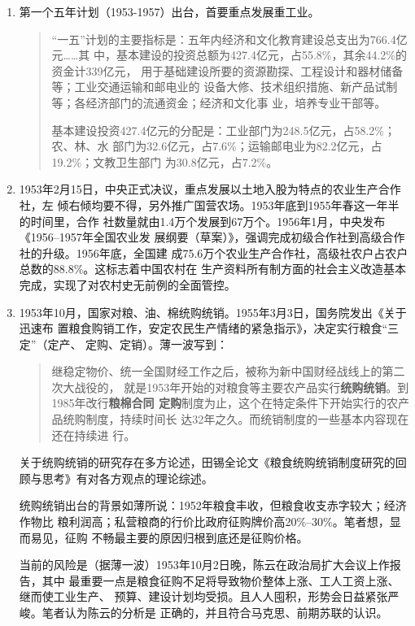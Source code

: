 \begin{enumerate}
\item 第一个五年计划（1953-1957）出台，首要重点发展重工业。
  \begin{quotation}
    “一五”计划的主要指标是：五年内经济和文化教育建设总支出为766.4亿元……其
    中，基本建设的投资总额为427.4亿元，占55.8\%，其余44.2\%的资金计339亿元，
    用于基础建设所要的资源勘探、工程设计和器材储备等；工业交通运输和邮电业的
    设备大修、技术组织措施、新产品试制等；各经济部门的流通资金；经济和文化事
    业，培养专业干部等。

    基本建设投资427.4亿元的分配是：工业部门为248.5亿元，占58.2\%；农、林、水
    部门为32.6亿元，占7.6\%；运输邮电业为82.2亿元，占19.2\%；文教卫生部门
    为30.8亿元，占7.2\%。
  \end{quotation}

\item 1953年2月15日，中央正式决议，重点发展以土地入股为特点的农业生产合作社，左
  倾右倾均要不得，另外推广国营农场。1953年底到1955年春这一年半的时间里，合作
  社数量就由1.4万个发展到67万个。1956年1月，中央发布《1956--1957年全国农业发
  展纲要（草案）》，强调完成初级合作社到高级合作社的升级。1956年底，全国建
  成75.6万个农业生产合作社，高级社农户占农户总数的88.8\%。这标志着中国农村在
  生产资料所有制方面的社会主义改造基本完成，实现了对农村史无前例的全面管控。

\item 1953年10月，国家对粮、油、棉统购统销。1955年3月3日，国务院发出《关于迅速布
  置粮食购销工作，安定农民生产情绪的紧急指示》，决定实行粮食“三定”（定产、
  定购、定销）。薄一波写到：
  \begin{quotation}
    继稳定物价、统一全国财经工作之后，被称为新中国财经战线上的第二次大战役的，
    就是1953年开始的对粮食等主要农产品实行\textbf{统购统销}。到1985年改行\textbf{粮棉合同
      定购}制度为止，这个在特定条件下开始实行的农产品统购制度，持续时间长
    达32年之久。而统销制度的一些基本内容现在还在持续进
    行。
  \end{quotation}

  关于统购统销的研究存在多方论述，田锡全论文《粮食统购统销制度研究的回
  顾与思考》有对各方观点的理论综述。

  统购统销出台的背景如薄所说：1952年粮食丰收，但粮食收支赤字较大；经济作物比
  粮利润高；私营粮商的行价比政府征购牌价高20\%--30\%。笔者想，显而易见，征购
  不畅最主要的原因归根到底还是征购价格。

  当前的风险是（据薄一波）1953年10月2日晚，陈云在政治局扩大会议上作报告，其中
  最重要一点是粮食征购不足将导致物价整体上涨、工人工资上涨、继而使工业生产、
  预算、建设计划均受损。且人人囤积，形势会日益紧张严峻。笔者认为陈云的分析是
  正确的，并且符合马克思、前期苏联的认识。


\end{enumerate}
